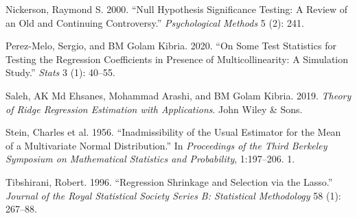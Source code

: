 \documentclass[
]{interact}
\newlength{\cslhangindent}
\newenvironment{CSLReferences}[2] %
 {\begin{list}{}{%
  \setlength{\itemindent}{0pt}
  \setlength{\leftmargin}{0pt}
  \setlength{\parsep}{0pt}
  \ifodd #1
   \setlength{\leftmargin}{\cslhangindent}
   \setlength{\itemindent}{-1\cslhangindent}
  \fi
  \setlength{\itemsep}{#2\baselineskip}}}
 {\end{list}}
\begin{document}
\begin{CSLReferences}{1}{0}
Nickerson, Raymond S. 2000. {``Null Hypothesis Significance Testing: A
Review of an Old and Continuing Controversy.''} \emph{Psychological
Methods} 5 (2): 241.

Perez-Melo, Sergio, and BM Golam Kibria. 2020. {``On Some Test
Statistics for Testing the Regression Coefficients in Presence of
Multicollinearity: A Simulation Study.''} \emph{Stats} 3 (1): 40--55.

Saleh, AK Md Ehsanes, Mohammad Arashi, and BM Golam Kibria. 2019.
\emph{Theory of Ridge Regression Estimation with Applications}. John
Wiley \& Sons.

Stein, Charles et al. 1956. {``Inadmissibility of the Usual Estimator
for the Mean of a Multivariate Normal Distribution.''} In
\emph{Proceedings of the Third Berkeley Symposium on Mathematical
Statistics and Probability}, 1:197--206. 1.

Tibshirani, Robert. 1996. {``Regression Shrinkage and Selection via the
Lasso.''} \emph{Journal of the Royal Statistical Society Series B:
Statistical Methodology} 58 (1): 267--88.

\end{CSLReferences}
\end{document}
